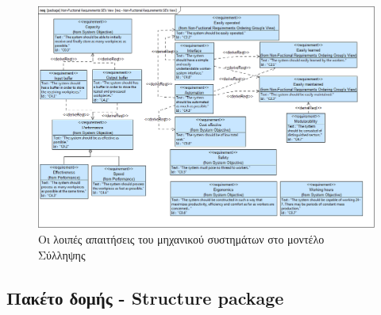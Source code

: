 \documentclass[a4paper,12pt,twoside]{report}
\begin{document}
{\begin{appendices}
				\begin{figure}[hp]
					\centering
					\includegraphics[scale=0.30]{ConceptionalModel_req-Non-FuctionalRequirementsSEsView.png}
					\caption{Οι λοιπές απαιτήσεις του μηχανικού συστημάτων στο μοντέλο Σύλληψης}
					\label{φωτ:Οι λοιπές απαιτήσεις του μηχανικού συστημάτων στο μοντέλο Σύλληψης}
				\end{figure}
			
			\FloatBarrier			
			\subsection{Πακέτο δομής - Structure package}


\end{appendices}}
\end{document}
